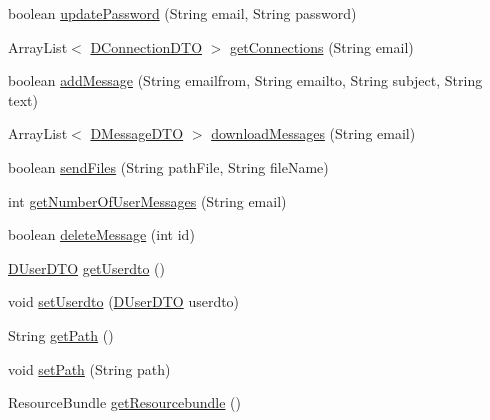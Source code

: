 \begin{DoxyCompactItemize}
\item 
boolean \mbox{\hyperlink{classes_1_1deusto_1_1bspq18_1_1e6_1_1_deusto_box_1_1_client_1_1controller_1_1_controller_aa89395e5fe1388292fddae864ca16765}{update\+Password}} (String email, String password)
\item 
Array\+List$<$ \mbox{\hyperlink{classes_1_1deusto_1_1bspq18_1_1e6_1_1_deusto_box_1_1_server_1_1dto_1_1_d_connection_d_t_o}{D\+Connection\+D\+TO}} $>$ \mbox{\hyperlink{classes_1_1deusto_1_1bspq18_1_1e6_1_1_deusto_box_1_1_client_1_1controller_1_1_controller_a00b07e74b392861bf33230cd9c2743b3}{get\+Connections}} (String email)
\item 
boolean \mbox{\hyperlink{classes_1_1deusto_1_1bspq18_1_1e6_1_1_deusto_box_1_1_client_1_1controller_1_1_controller_a94aca031c4d92a581036dff8f7784c89}{add\+Message}} (String emailfrom, String emailto, String subject, String text)
\item 
Array\+List$<$ \mbox{\hyperlink{classes_1_1deusto_1_1bspq18_1_1e6_1_1_deusto_box_1_1_server_1_1dto_1_1_d_message_d_t_o}{D\+Message\+D\+TO}} $>$ \mbox{\hyperlink{classes_1_1deusto_1_1bspq18_1_1e6_1_1_deusto_box_1_1_client_1_1controller_1_1_controller_af5d6aa5921e35df50ed907344a4d8ab5}{download\+Messages}} (String email)
\item 
boolean \mbox{\hyperlink{classes_1_1deusto_1_1bspq18_1_1e6_1_1_deusto_box_1_1_client_1_1controller_1_1_controller_a5817d0c4e59edbc9b95fd9089e52849e}{send\+Files}} (String path\+File, String file\+Name)
\item 
int \mbox{\hyperlink{classes_1_1deusto_1_1bspq18_1_1e6_1_1_deusto_box_1_1_client_1_1controller_1_1_controller_a32e13a351d673c45ea91971efe6e3ac5}{get\+Number\+Of\+User\+Messages}} (String email)
\item 
boolean \mbox{\hyperlink{classes_1_1deusto_1_1bspq18_1_1e6_1_1_deusto_box_1_1_client_1_1controller_1_1_controller_a5c07142a949f9ad8e5a489f19cb73c5a}{delete\+Message}} (int id)
\item 
\mbox{\hyperlink{classes_1_1deusto_1_1bspq18_1_1e6_1_1_deusto_box_1_1_server_1_1dto_1_1_d_user_d_t_o}{D\+User\+D\+TO}} \mbox{\hyperlink{classes_1_1deusto_1_1bspq18_1_1e6_1_1_deusto_box_1_1_client_1_1controller_1_1_controller_a2971b74004f56984f425967d5ddfffdc}{get\+Userdto}} ()
\item 
void \mbox{\hyperlink{classes_1_1deusto_1_1bspq18_1_1e6_1_1_deusto_box_1_1_client_1_1controller_1_1_controller_a837623ed4875f6b25560e83d3beae961}{set\+Userdto}} (\mbox{\hyperlink{classes_1_1deusto_1_1bspq18_1_1e6_1_1_deusto_box_1_1_server_1_1dto_1_1_d_user_d_t_o}{D\+User\+D\+TO}} userdto)
\item 
String \mbox{\hyperlink{classes_1_1deusto_1_1bspq18_1_1e6_1_1_deusto_box_1_1_client_1_1controller_1_1_controller_a45c70242399ca90950c7f288b2eeaee7}{get\+Path}} ()
\item 
void \mbox{\hyperlink{classes_1_1deusto_1_1bspq18_1_1e6_1_1_deusto_box_1_1_client_1_1controller_1_1_controller_ac56489e3885d063e14a9a9127fc8e318}{set\+Path}} (String path)
\item 
Resource\+Bundle \mbox{\hyperlink{classes_1_1deusto_1_1bspq18_1_1e6_1_1_deusto_box_1_1_client_1_1controller_1_1_controller_a2abd8bf652903aaaed48f52fbecefda1}{get\+Resourcebundle}} ()
\end{DoxyCompactItemize}
